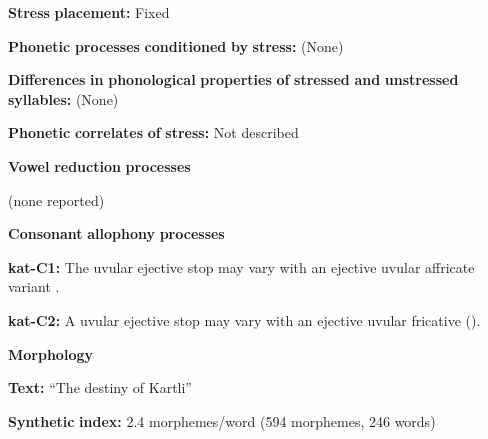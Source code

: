 \begin{styleBody}
\textbf{Stress} \textbf{placement:} Fixed
\end{styleBody}

\begin{styleBody}
\textbf{Phonetic} \textbf{processes} \textbf{conditioned} \textbf{by} \textbf{stress:} (None)
\end{styleBody}

\begin{styleBody}
\textbf{Differences} \textbf{in} \textbf{phonological} \textbf{properties} \textbf{of} \textbf{stressed} \textbf{and} \textbf{unstressed} \textbf{syllables:} (None)
\end{styleBody}

\begin{styleBody}
\textbf{Phonetic} \textbf{correlates} \textbf{of} \textbf{stress:} Not described
\end{styleBody}

\begin{styleBody}
\textbf{Vowel} \textbf{reduction} \textbf{processes}
\end{styleBody}

\begin{styleBody}
(none reported)
\end{styleBody}

\begin{styleBody}
\textbf{Consonant} \textbf{allophony} \textbf{processes}
\end{styleBody}

\begin{styleBody}
\textbf{kat-C1:} The uvular ejective stop may vary with an ejective uvular affricate variant \citep{Aronson1991}.
\end{styleBody}

\begin{styleBody}
\textbf{kat-C2:} A uvular ejective stop may vary with an ejective uvular fricative (\citealt{ShostedChikovani2006}).
\end{styleBody}

\begin{styleBody}
\textbf{Morphology}
\end{styleBody}

\begin{styleBody}
\textbf{Text:} “The destiny of Kartli” \citep[655-663]{Hewitt1995}
\end{styleBody}

\begin{styleBody}
\textbf{Synthetic} \textbf{index:} 2.4 morphemes/word (594 morphemes, 246 words)
\end{styleBody}

